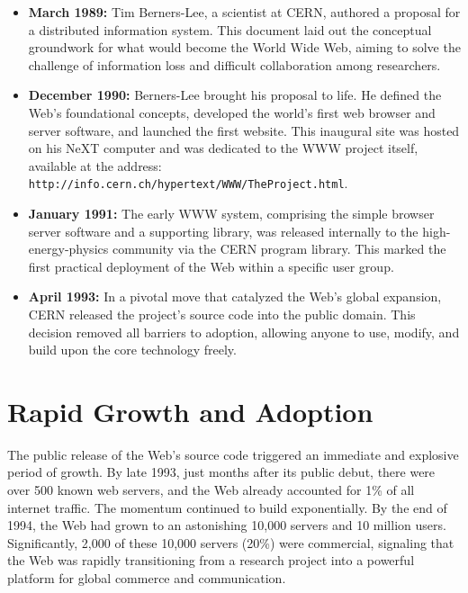 \documentclass{scrbook}
\begin{document}
\begin{itemize}
    \item
    \textbf{March 1989:} Tim Berners-Lee, a scientist at CERN, authored a proposal for a distributed information system. This document laid out the conceptual groundwork for what would become the World Wide Web, aiming to solve the challenge of information loss and difficult collaboration among researchers.

    \item
    \textbf{December 1990:} Berners-Lee brought his proposal to life. He defined the Web’s foundational concepts, developed the world's first web browser and server software, and launched the first website. This inaugural site was hosted on his NeXT computer and was dedicated to the WWW project itself, available at the address: \\ \texttt{http://info.cern.ch/hypertext/WWW/TheProject.html}.

    \item
    \textbf{January 1991:} The early WWW system, comprising the simple browser server software and a supporting library, was released internally to the high-energy-physics community via the CERN program library. This marked the first practical deployment of the Web within a specific user group.

    \item
    \textbf{April 1993:} In a pivotal move that catalyzed the Web's global expansion, CERN released the project's source code into the public domain. This decision removed all barriers to adoption, allowing anyone to use, modify, and build upon the core technology freely.
\end{itemize}

\section{Rapid Growth and Adoption}

The public release of the Web's source code triggered an immediate and explosive period of growth. By late 1993, just months after its public debut, there were over 500 known web servers, and the Web already accounted for 1\% of all internet traffic. The momentum continued to build exponentially. By the end of 1994, the Web had grown to an astonishing 10,000 servers and 10 million users. Significantly, 2,000 of these 10,000 servers (20\%) were commercial, signaling that the Web was rapidly transitioning from a research project into a powerful platform for global commerce and communication. \\
\end{document}

